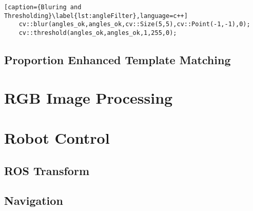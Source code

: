 \begin{lstlisting}[caption={Bluring and Thresholding}\label{lst:angleFilter},language=c++]
	cv::blur(angles_ok,angles_ok,cv::Size(5,5),cv::Point(-1,-1),0);
	cv::threshold(angles_ok,angles_ok,1,255,0);
\end{lstlisting}







\subsection{Proportion Enhanced Template Matching}


% 
% 
% 
% 
% 
% 
% 










\section{RGB Image Processing}


\section{Robot Control}
\subsection{ROS Transform}
\subsection{Navigation}
